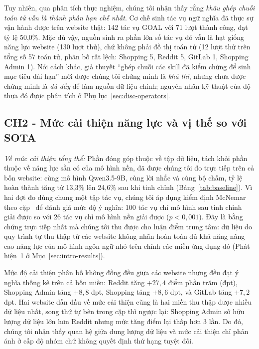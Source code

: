 Tuy nhiên, qua phân tích thực nghiệm, chúng tôi nhận thấy rằng \emph{khâu ghép chuỗi toán tử vẫn là thành phần hạn chế nhất}. Cơ chế sinh tác vụ ngữ nghĩa đã thực sự vận hành được trên website thật: 142 tác vụ GOAL với 71 lượt thành công, đạt tỷ lệ 50{,}0\%. Mặc dù vậy, nguồn sinh ra phần lớn số tác vụ đó vẫn là hạt giống năng lực website (130 lượt thử), chứ không phải đồ thị toán tử (12 lượt thử trên tổng số 57 toán tử, phân bố rất lệch: Shopping 5, Reddit 5, GitLab 1, Shopping Admin 1). Nói cách khác, giả thuyết ``ghép chuỗi các skill đã kiểm chứng để sinh mục tiêu dài hạn'' mới được chúng tôi chứng minh là \emph{khả thi}, nhưng chưa được chứng minh là \emph{đủ dầy} để làm nguồn dữ liệu chính; nguyên nhân kỹ thuật của độ thưa đó được phân tích ở Phụ lục~\ref{sec:disc-operators}.

\subsection{CH2 - Mức cải thiện năng lực và vị thế so với SOTA}

\emph{Về mức cải thiện tổng thể:} Phần đóng góp thuộc về tập dữ liệu, tách khỏi phần thuộc về năng lực sẵn có của mô hình nền, đã được chúng tôi đo trực tiếp trên cả bốn website: cùng mô hình Qwen3.5-9B, cùng lời nhắc và cùng bộ chấm, tỷ lệ hoàn thành tăng từ 13{,}3\% lên 24{,}6\% sau khi tinh chỉnh (Bảng~\ref{tab:baseline}). Vì hai đợt đo dùng chung một tập tác vụ, chúng tôi áp dụng kiểm định McNemar theo cặp~\cite{mcnemar1947} để đánh giá mức độ ý nghĩa: 100 tác vụ chỉ mô hình sau tinh chỉnh giải được so với 26 tác vụ chỉ mô hình nền giải được ($p < 0{,}001$). Đây là bằng chứng trực tiếp nhất mà chúng tôi thu được cho luận điểm trung tâm: dữ liệu do quy trình tự thu thập từ các website không nhãn hoàn toàn đủ khả năng nâng cao năng lực của mô hình ngôn ngữ nhỏ trên chính các miền ứng dụng đó (Phát hiện~1 ở Mục~\ref{sec:intro-results}).

Mức độ cải thiện phân bố không đồng đều giữa các website nhưng đều đạt ý nghĩa thống kê trên cả bốn miền: Reddit tăng $+27{,}4$ điểm phần trăm (đpt), Shopping Admin tăng $+8{,}8$ đpt, Shopping tăng $+8{,}6$ đpt, và GitLab tăng $+7{,}2$ đpt. Hai website dẫn đầu về mức cải thiện cũng là hai miền thu thập được nhiều dữ liệu nhất, song thứ tự bên trong cặp thì ngược lại: Shopping Admin sở hữu lượng dữ liệu lớn hơn Reddit nhưng mức tăng điểm lại thấp hơn 3 lần. Do đó, chúng tôi nhận thấy quan hệ giữa dung lượng dữ liệu và mức cải thiện chỉ phản ánh ở cấp độ nhóm chứ không quyết định thứ hạng tuyệt đối.

